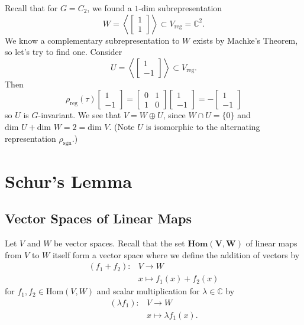 \begin{frame}
\begin{example}
Recall that for  $G= C_2$, we found a $1$-dim subrepresentation 
\[ W = \left< \begin{bmatrix}1 \\ 1 \end{bmatrix} \right> \subset V_{\text{reg}}= \mathbb{C}^2 . \]
We know a complementary subrepresentation to $W$ exists by Machke's Theorem, so let's try to find one.  Consider
\[ U =  \left< \begin{bmatrix}1 \\ -1 \end{bmatrix} \right> \subset V_{\text{reg}}. \]
Then
\[ \rho_{\text{reg}}(\tau) \begin{bmatrix}1 \\ -1 \end{bmatrix} =  \begin{bmatrix} 0 & 1 \\ 1 & 0 \end{bmatrix} \begin{bmatrix}1 \\ -1 \end{bmatrix} = -  \begin{bmatrix}1 \\ -1 \end{bmatrix} \]
so $U$ is $G$-invariant.  We see that $V = W \oplus U$, since $W \cap U = \{ 0 \}$ and $\text{dim } U + \text{dim } W = 2 = \text{dim } V$.   (Note $U$ is isomorphic to the alternating representation $\rho_{\text{sgn}}$.)
\end{example}
\end{frame}

\section{Schur's Lemma}
\subsection{Vector Spaces of Linear Maps}
\begin{frame}
\begin{definition}
Let $V$ and $W$ be vector spaces.  Recall that the set $\textbf{Hom}\mathbf{(V,W)}$ of linear maps from $V$ to $W$ itself form a vector space where we define the addition of vectors by
\begin{align*}		
(f_1 + f_2) \colon &V \to W \\		
&x \mapsto f_1(x) + f_2(x)		
\end{align*}		
for  $f_1, f_2 \in \text{Hom}(V,W)$ and scalar multiplication for $\lambda \in \mathbb{C}$ by
\begin{align*}		
(\lambda f_1) \colon &V \to W \\		
&x \mapsto \lambda f_1(x).		
\end{align*}		

\end{definition}
\end{frame}

